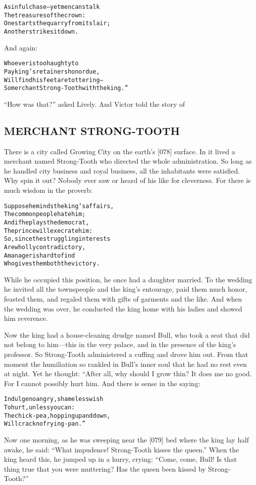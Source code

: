 \documentclass{article}
\renewenvironment{verbatim}{\begin{alltt}\normalfont\begin{centering}}{\end{centering}\end{alltt}}
\begin{document}
\begin{verbatim}
A sinful chase--yet men can stalk
    The treasures of the crown:
One starts the quarry from its lair;
    Another strikes it down.
\end{verbatim}
And again:

\begin{verbatim}
Whoever is too haughty to
Pay king's retainers honor due,
Will find his feet are tottering--
So merchant Strong-Tooth with the king.”
\end{verbatim}
``How was that?'' asked Lively. And Victor told the story of

\subsection{MERCHANT STRONG-TOOTH}

There is a city called Growing City on the earth's [078] surface.
In it lived a merchant named Strong-Tooth who directed the whole
administration. So long as he handled city business and royal
business, all the inhabitants were satisfied. Why spin it out?
Nobody ever saw or heard of his like for cleverness. For there is
much wisdom in the proverb:

\begin{verbatim}
Suppose he minds the king's affairs,
    The common people hate him;
And if he plays the democrat,
    The prince will execrate him:
So, since the struggling interests
    Are wholly contradictory,
A manager is hard to find
    Who gives them both the victory.
\end{verbatim}
While he occupied this position, he once had a daughter married. To
the wedding he invited all the townspeople and the king's
entourage, paid them much honor, feasted them, and regaled them
with gifts of garments and the like. And when the wedding was over,
he conducted the king home with his ladies and showed him
reverence.

Now the king had a house-cleaning drudge named Bull, who took a
seat that did not belong to him---this in the very palace, and in
the presence of the king's professor. So Strong-Tooth administered
a cuffing and drove him out. From that moment the humiliation so
rankled in Bull's inner soul that he had no rest even at night. Yet
he thought: “After all, why should I grow thin? It does me no good.
For I cannot possibly hurt him. And there is sense in the saying:

\begin{verbatim}
Indulge no angry, shameless wish
    To hurt, unless you can:
The chick-pea, hopping up and down,
    Will crack no frying-pan.”
\end{verbatim}
Now one morning, as he was sweeping near the [079] bed where the
king lay half awake, he said:
``What impudence! Strong-Tooth kisses the queen.'' When the king
heard this, he jumped up in a hurry, crying:
``Come, come, Bull! Is that thing true that you were muttering? Has the queen been kissed by Strong-Tooth?''
\end{document}
